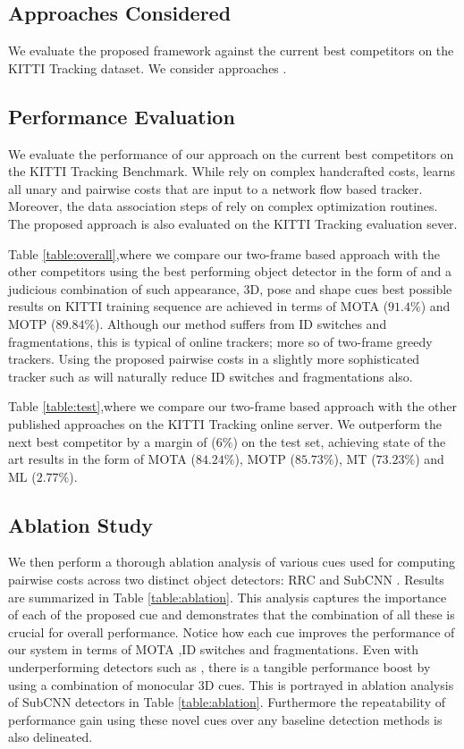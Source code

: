 \documentclass[letterpaper, 10 pt, conference]{ieeeconf}
\begin{document}
\subsection{Approaches Considered}
We evaluate the proposed framework against the current best competitors on the KITTI Tracking dataset. We consider approaches \cite{DeepNetworkFlow,NOMT,CIWT,followme}. 

\subsection{Performance Evaluation}
We evaluate the performance of our approach on the current best competitors on the KITTI Tracking Benchmark. While \cite{NOMT,CIWT,followme} rely on complex handcrafted costs, \cite{DeepNetworkFlow} learns all unary and pairwise costs that are input to a network flow based tracker. Moreover, the data association steps of \cite{NOMT,CIWT,followme} rely on complex optimization routines. The proposed approach is also evaluated on the KITTI Tracking evaluation sever.


Table \ref{table:overall},where we compare our two-frame based approach with the other competitors using the best performing object detector in the form of \cite{RRC} and a judicious combination of such appearance, 3D, pose and shape cues best possible results on KITTI training sequence are achieved in terms of MOTA ($91.4\%$) and MOTP ($89.84\%$). Although our method suffers from ID switches and fragmentations, this is typical of online trackers; more so of two-frame greedy trackers. Using the proposed pairwise costs in a slightly more sophisticated tracker such as \cite{NOMT,followme} will naturally reduce ID switches and fragmentations also.

Table \ref{table:test},where we compare our two-frame based approach with the other published approaches on the KITTI Tracking online server. We outperform the next best competitor by a margin of ($6\%$) on the test set, achieving state of the art results in the form of MOTA ($84.24\%$), MOTP ($85.73\%$), MT ($73.23\%$) and ML ($2.77\%$).

\subsection{Ablation Study}

We then perform a thorough ablation analysis of various cues used for computing pairwise costs across two distinct object detectors: RRC \cite{RRC} and SubCNN \cite{SubCNN}. 
Results are summarized in Table \ref{table:ablation}. This analysis captures the importance of each of the proposed cue and demonstrates that the combination of all these is crucial for overall performance. Notice how each cue improves the performance of our system in terms of MOTA ,ID switches and fragmentations. Even with underperforming detectors such as \cite{SubCNN}, there is a tangible performance boost by using a combination of monocular 3D cues. This is portrayed in ablation analysis of SubCNN detectors in Table \ref{table:ablation}. Furthermore the repeatability of performance gain using these novel cues over any baseline detection methods is also delineated.
\end{document}
